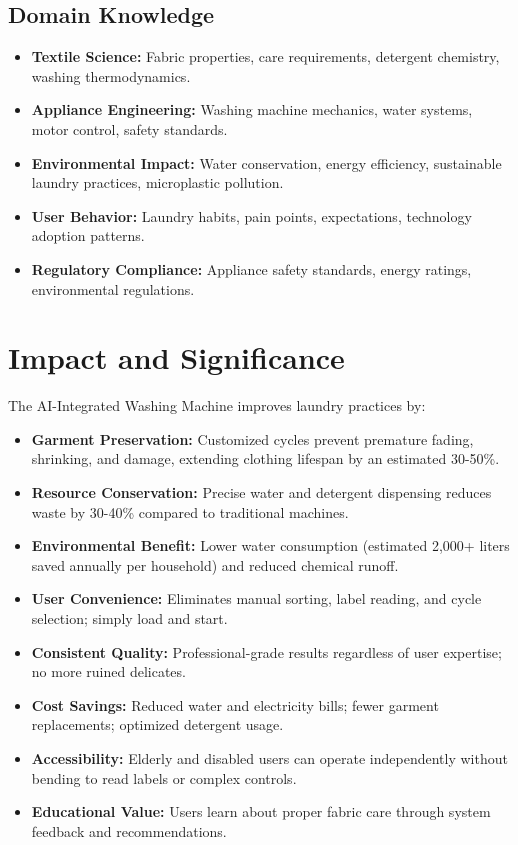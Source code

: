 \subsection{Domain Knowledge}
\begin{itemize}
    \item \textbf{Textile Science:} Fabric properties, care requirements, detergent chemistry, washing thermodynamics.
    \item \textbf{Appliance Engineering:} Washing machine mechanics, water systems, motor control, safety standards.
    \item \textbf{Environmental Impact:} Water conservation, energy efficiency, sustainable laundry practices, microplastic pollution.
    \item \textbf{User Behavior:} Laundry habits, pain points, expectations, technology adoption patterns.
    \item \textbf{Regulatory Compliance:} Appliance safety standards, energy ratings, environmental regulations.
\end{itemize}

\section{Impact and Significance}
The AI-Integrated Washing Machine improves laundry practices by:

\begin{itemize}
    \item \textbf{Garment Preservation:} Customized cycles prevent premature fading, shrinking, and damage, extending clothing lifespan by an estimated 30-50\%.
    \item \textbf{Resource Conservation:} Precise water and detergent dispensing reduces waste by 30-40\% compared to traditional machines.
    \item \textbf{Environmental Benefit:} Lower water consumption (estimated 2,000+ liters saved annually per household) and reduced chemical runoff.
    \item \textbf{User Convenience:} Eliminates manual sorting, label reading, and cycle selection; simply load and start.
    \item \textbf{Consistent Quality:} Professional-grade results regardless of user expertise; no more ruined delicates.
    \item \textbf{Cost Savings:} Reduced water and electricity bills; fewer garment replacements; optimized detergent usage.
    \item \textbf{Accessibility:} Elderly and disabled users can operate independently without bending to read labels or complex controls.
    \item \textbf{Educational Value:} Users learn about proper fabric care through system feedback and recommendations.
\end{itemize}

